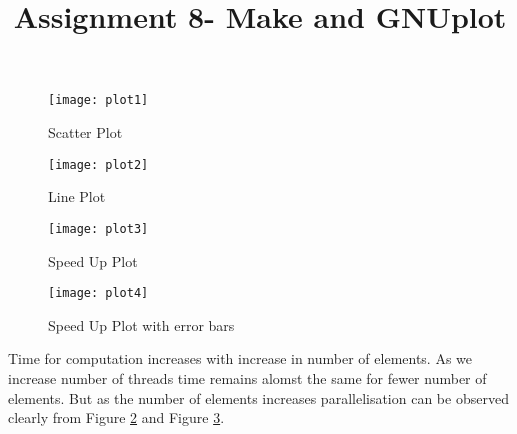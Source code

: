 \documentclass[]{article}
\title{Assignment 8- \textbf{Make and GNUplot}}
\author{}
\date{}
\begin{document}
\maketitle
\begin{figure}[H]
\centering
\texttt{[image: plot1]}
\caption{Scatter Plot}
\label{fig:plot1}
\end{figure}

\begin{figure}[H]
	\centering
	\texttt{[image: plot2]}
	\caption{Line Plot}
	\label{fig:plot2}
\end{figure}

\begin{figure}[H]
	\centering
	\texttt{[image: plot3]}
	\caption{Speed Up Plot}
	\label{fig:plot3}
\end{figure}

\begin{figure}[H]
	\centering
	\texttt{[image: plot4]}
	\caption{Speed Up Plot with error bars}
	\label{fig:plot4}
\end{figure}

Time for computation increases with increase in number of elements. As we increase number of threads time remains alomst the same for fewer number of elements. But as the number of elements increases parallelisation can be observed clearly from Figure \ref{fig:plot2} and Figure \ref{fig:plot3}.
\end{document}
